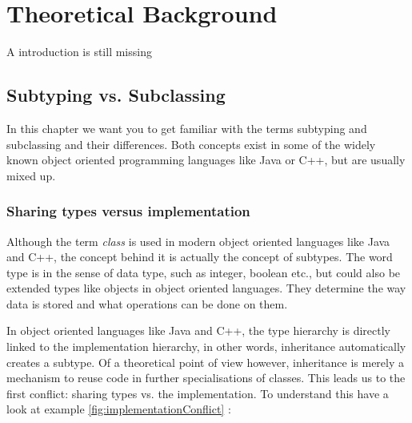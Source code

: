 
\part{Theoretical Background}
A introduction is still missing

\chapter{Subtyping vs. Subclassing}
\label{chap:subtypingVsSubclassing}
In this chapter we want you to get familiar with the terms subtyping
and subclassing and their differences. Both concepts exist in some of
the widely known object oriented programming languages like Java or C++,
but are usually mixed up.

\section{Sharing types versus implementation}
\label{sec:sharingTypes}

Although the term \emph{class} is used in modern object oriented
languages like Java and C++, the concept behind it is actually the
concept of subtypes.  The word type is in the sense of data type, such
as integer, boolean etc., but could also be extended types like objects
in object oriented languages. They determine the way data is stored and
what operations can be done on them.

In object oriented languages like Java and C++, the type hierarchy
is directly linked to the implementation hierarchy, in other words,
inheritance automatically creates a subtype. Of a theoretical point
of view however, inheritance is merely a mechanism to reuse code in
further specialisations of classes. This leads us to the first conflict:
sharing types vs. the implementation. To understand this have a look at
example \ref{fig:implementationConflict} \cite{simons_theory_2003-4}:

